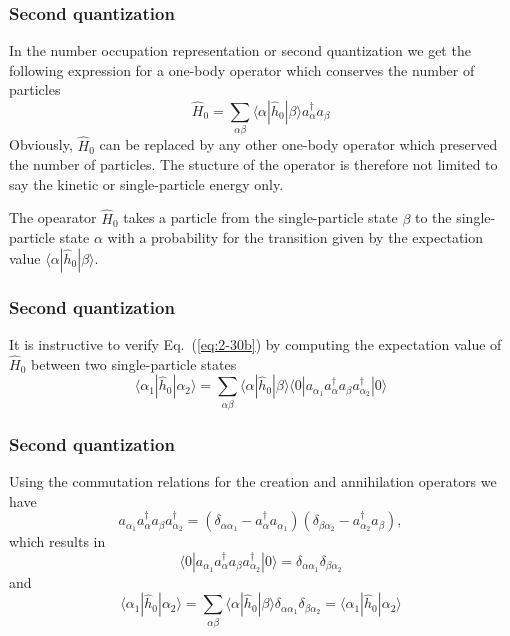 \documentclass{beamer}
\begin{document}
\begin{frame}
\frametitle{Second quantization}

\begin{block}{}
In the number occupation representation or second quantization we get the following expression for a one-body 
operator which conserves the number of particles
\begin{equation}
	\hat{H}_0 = \sum_{\alpha\beta} \langle \alpha|\hat{h}_0|\beta\rangle a_\alpha^{\dagger} a_\beta \label{eq:2-30b}
\end{equation}
Obviously, $\hat{H}_0$ can be replaced by any other one-body  operator which preserved the number
of particles. The stucture of the operator is therefore not limited to say the kinetic or single-particle energy only.

The opearator $\hat{H}_0$ takes a particle from the single-particle state $\beta$  to the single-particle state $\alpha$ 
with a probability for the transition given by the expectation value $\langle \alpha|\hat{h}_0|\beta\rangle$.
\end{block}
\end{frame}

\begin{frame}
\frametitle{Second quantization}

\begin{block}{}
It is instructive to verify Eq.~(\ref{eq:2-30b}) by computing the expectation value of $\hat{H}_0$ 
between two single-particle states
\begin{equation}
	\langle \alpha_1|\hat{h}_0|\alpha_2\rangle = \sum_{\alpha\beta} \langle \alpha|\hat{h}_0|\beta\rangle
		\langle 0|a_{\alpha_1}a_\alpha^{\dagger} a_\beta a_{\alpha_2}^{\dagger}|0\rangle \label{eq:2-30c}
\end{equation}
\end{block}
\end{frame}

\begin{frame}
\frametitle{Second quantization}

\begin{block}{}
Using the commutation relations for the creation and annihilation operators we have 
\begin{equation}
a_{\alpha_1}a_\alpha^{\dagger} a_\beta a_{\alpha_2}^{\dagger} = (\delta_{\alpha \alpha_1} - a_\alpha^{\dagger} a_{\alpha_1} )(\delta_{\beta \alpha_2} - a_{\alpha_2}^{\dagger} a_{\beta} ), \label{eq:2-30d}
\end{equation}
which results in
\begin{equation}
\langle 0|a_{\alpha_1}a_\alpha^{\dagger} a_\beta a_{\alpha_2}^{\dagger}|0\rangle = \delta_{\alpha \alpha_1} \delta_{\beta \alpha_2} \label{eq:2-30e}
\end{equation}
and
\begin{equation}
\langle \alpha_1|\hat{h}_0|\alpha_2\rangle = \sum_{\alpha\beta} \langle \alpha|\hat{h}_0|\beta\rangle\delta_{\alpha \alpha_1} \delta_{\beta \alpha_2} = \langle \alpha_1|\hat{h}_0|\alpha_2\rangle \label{eq:2-30f}
\end{equation}
\end{block}
\end{frame}
\end{document}
